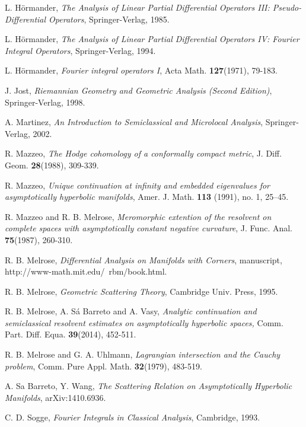 \documentclass[10pt, a4paper, twoside]{amsart}
\numberwithin{equation}{section}
\theoremstyle{remark}
\begin{document}
\begin{thebibliography}{99}
L. H\"{o}rmander, \emph{The Analysis of Linear Partial Differential Operators III: Pseudo-Differential Operators}, Springer-Verlag, 1985.

L. H\"{o}rmander, \emph{The Analysis of Linear Partial Differential Operators IV: Fourier Integral Operators}, Springer-Verlag, 1994.

L. H\"{o}rmander, \emph{Fourier integral operators I}, Acta Math. \textbf{127}(1971), 79-183.

J. Jost, \emph{Riemannian Geometry and Geometric Analysis (Second Edition)}, Springer-Verlag, 1998.

A. Martinez, \emph{An Introduction to Semiclassical and Microlocal Analysis}, Springer-Verlag, 2002.

R. Mazzeo, \emph{The Hodge cohomology of a conformally compact metric},  J. Diff. Geom. \textbf{28}(1988), 309-339.

R. Mazzeo, \emph{Unique continuation at infinity and embedded eigenvalues for asymptotically hyperbolic manifolds},  
Amer. J. Math. \textbf{113} (1991), no. 1, 25--45. 

R. Mazzeo and R. B. Melrose, \emph{Meromorphic extention of the resolvent on complete spaces with asymptotically constant negative curvature}, J. Func. Anal. \textbf{75}(1987), 260-310.

R. B. Melrose, \emph{Differential Analysis on Manifolds with Corners}, manuscript, http://www-math.mit.edu/~rbm/book.html. 

R. B. Melrose, \emph{Geometric Scattering Theory}, Cambridge Univ. Press, 1995.

R. B. Melrose, A. S\'{a} Barreto and A. Vasy, \emph{Analytic continuation and semiclassical resolvent estimates on asymptotically hyperbolic spaces,}  Comm. Part. Diff. Equa. \textbf{39}(2014), 452-511.

R. B. Melrose and G. A. Uhlmann, \emph{Lagrangian intersection and the Cauchy problem}, Comm. Pure Appl. Math. \textbf{32}(1979), 483-519.

 A. Sa Barreto, Y. Wang, \emph{The Scattering Relation on Asymptotically Hyperbolic Manifolds}, 
arXiv:1410.6936. 

C. D. Sogge, \emph{Fourier Integrals in Classical Analysis}, Cambridge, 1993.


\end{thebibliography}
\end{document}
